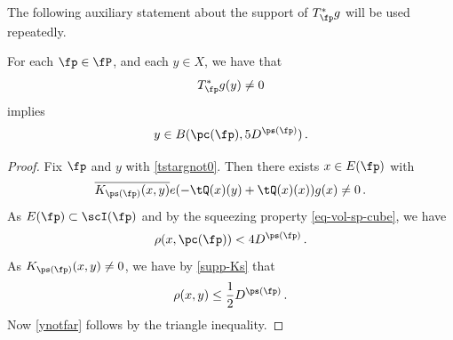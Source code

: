 The following auxiliary statement about the support of $T_\fp^*g$ will be
used repeatedly.

\begin{lemma}\label{tile-range-support}
    \leanok
        For each $\fp\in \fP$, and each $y\in X$, we have that
    \begin{equation}\label{tstargnot0}
         T_{\fp}^* g(y)\neq 0
    \end{equation}
       implies
    \begin{equation}\label{ynotfar}
        y\in B(\pc(\fp),5D^{\ps(\fp)})\, .
    \end{equation}
    \end{lemma}
    \begin{proof}
    \leanok
    Fix $\fp$ and $y$ with \eqref{tstargnot0}.
    Then there exists $x\in E(\fp)$ with
    \begin{equation}
       \overline{K_{\ps(\fp)}(x,y)}e(-\tQ(x)(y)
        +\tQ(x)(x))g(x) \neq 0\, .
    \end{equation}
    As $E(\fp)\subset \scI(\fp)$ and by the squeezing property
    \eqref{eq-vol-sp-cube}, we have
    \begin{equation}
        \rho(x,\pc(\fp)) < 4D^{\ps(\fp)}\, .
    \end{equation}
    As $K_{\ps(\fp)}(x,y)\neq 0$, we have by \eqref{supp-Ks}
    that
    \begin{equation}
    \rho(x,y)\le \frac 12 D^{\ps(\fp)}\, .
    \end{equation}
    Now \eqref{ynotfar} follows by the triangle inequality.
\end{proof}


